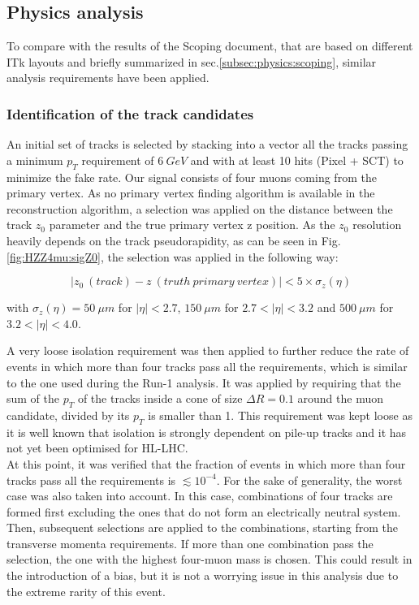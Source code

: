 \documentclass[a4paper,twoside,12pt]{article}
\begin{document}
\subsection{Physics analysis}\label{sec:physics:analysis}
To compare with the results of the Scoping document, that 
are based on different ITk layouts and briefly summarized in sec.\ref{subsec:physics:scoping}, 
similar analysis requirements have been applied. \\

\subsubsection{Identification of the track candidates}
An initial set of tracks is selected by stacking into a vector all the tracks passing a minimum
$p_{T}$ requirement of $6\ GeV$ and with at least 10 hits (Pixel + SCT) to minimize the fake rate. 
Our signal consists
of four muons coming from the primary vertex. As no primary vertex finding algorithm
is available in the reconstruction algorithm, 
a selection was applied on the distance between the track $z_0$ parameter and the true primary vertex
z position. As the 
$z_0$ resolution heavily depends on the track pseudorapidity, as can be seen in Fig.
\ref{fig:HZZ4mu:sigZ0}, the selection was applied in the following way:

\begin{equation*}
|z_0\ (track) - z\ (truth\ primary\ vertex)| < 5 \times \sigma_{z} (\eta)
\end{equation*}

with $\sigma_{z} (\eta) = 50\ \mu m$ for $|\eta| < 2.7$, $150\ \mu m$ for $2.7 < |\eta| < 3.2$
and $500\ \mu m$ for $3.2 < |\eta| < 4.0$. 

A very loose isolation requirement was then applied to further reduce the rate of events
in which more than four tracks pass all the requirements, which is similar to the one used during
the Run-1 analysis\cite{HZZ4mu_run1}. It was applied by requiring that the sum of the 
$p_T$ of the tracks inside a cone of size $\Delta R = 0.1$ around the muon
candidate, divided by its $p_T$ is smaller than 1. This requirement was kept loose as 
it is well known that isolation is strongly dependent on pile-up tracks and it has not yet
been optimised for HL-LHC.\\

At this point, it was verified that the fraction of events in which more than four tracks
pass all the requirements is $\lesssim 10^{-4}$. For the sake of generality, the worst 
case was also taken into account. In this case, combinations of four tracks are formed
first excluding the ones that do not form an electrically neutral system. Then, subsequent
selections are applied to the combinations, starting from the transverse momenta requirements. If more
than one combination pass the selection, the one with the highest four-muon mass is chosen. 
This could result in the introduction of a bias, but it is not a worrying issue in this analysis due to
the extreme rarity of this event.\\
\end{document}
